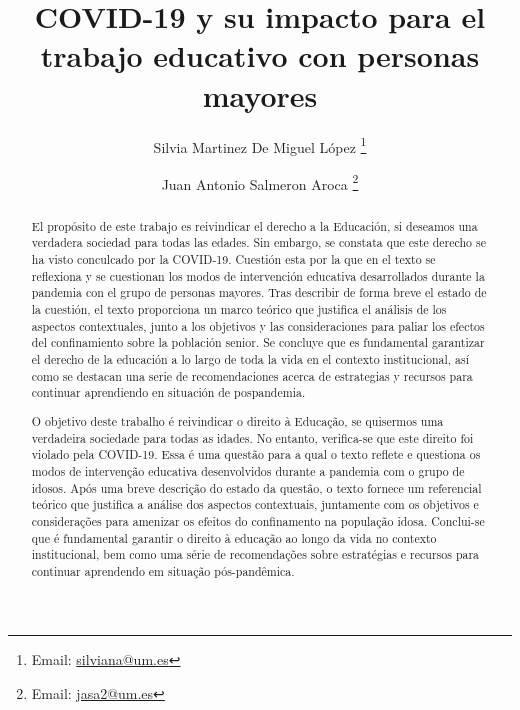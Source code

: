 \documentclass{textolivre}
\title{COVID-19 y su impacto para el trabajo educativo con personas mayores}
\author[1]{Silvia Martinez De Miguel López \orcid{0000-0001-7602-8796} \thanks{Email: \url{silviana@um.es}}}
\author[1]{Juan Antonio Salmeron Aroca \orcid{0000-0001-9482-2555} \thanks{Email: \url{jasa2@um.es}}}
\affil[1]{Universidad de Murcia. Facultad de 
Educación. Departamento de Teoría e Historia de la Educación, Murcia, España.}
\begin{document}
\maketitle

\begin{polyabstract}
\begin{abstract}
El propósito de este trabajo es reivindicar el derecho a la Educación, si deseamos una verdadera sociedad para todas las edades. Sin embargo, se constata que este derecho se ha visto conculcado por la COVID-19. Cuestión esta por la que en el texto se reflexiona y se cuestionan los modos de intervención educativa desarrollados durante la pandemia con el grupo de personas mayores. Tras describir de forma breve el estado de la cuestión, el texto proporciona un marco teórico que justifica el análisis de los aspectos contextuales, junto a los objetivos y las consideraciones para paliar los efectos del confinamiento sobre la población senior. Se concluye que es fundamental garantizar el derecho de la educación a lo largo de toda la vida en el contexto institucional, así como se destacan una serie de recomendaciones acerca de estrategias y recursos para continuar aprendiendo en situación de pospandemia.

\end{abstract}

\begin{portuguese}
\begin{abstract}
O objetivo deste trabalho é reivindicar o direito à Educação, se quisermos uma verdadeira sociedade para todas as idades. No entanto, verifica-se que este direito foi violado pela COVID-19. Essa é uma questão para a qual o texto reflete e questiona os modos de intervenção educativa desenvolvidos durante a pandemia com o grupo de idosos. Após uma breve descrição do estado da questão, o texto fornece um referencial teórico que justifica a análise dos aspectos contextuais, juntamente com os objetivos e considerações para amenizar os efeitos do confinamento na população idosa. Conclui-se que é fundamental garantir o direito à educação ao longo da vida no contexto institucional, bem como uma série de recomendações sobre estratégias e recursos para continuar aprendendo em situação pós-pandêmica.

\end{abstract}
\end{portuguese}


\end{polyabstract}
\end{document}
